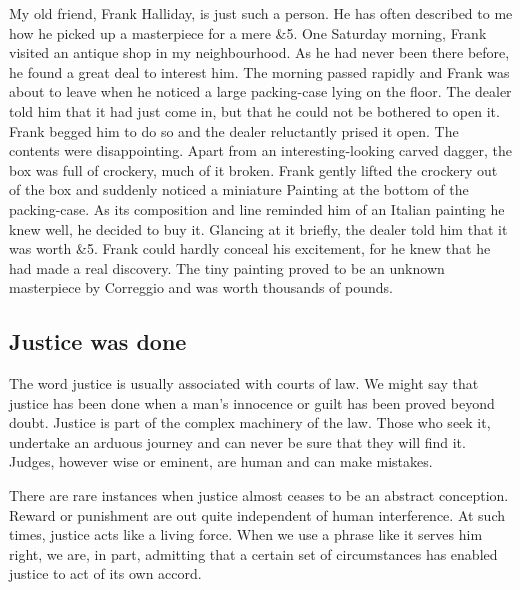 \documentclass[11pt]{article}
\begin{document}
My old friend, Frank Halliday, is just such a person. He has often described to me how he picked up a masterpiece for a mere \&5. One Saturday morning, Frank visited an antique shop in my neighbourhood. As he had never been there before, he found a great deal to interest him. The morning passed rapidly and Frank was about to leave when he noticed a large packing-case lying on the floor. The dealer told him that it had just come in, but that he could not be bothered to open it. Frank begged him to do so and the dealer reluctantly prised it open. The contents were disappointing. Apart from an interesting-looking carved dagger, the box was full of crockery, much of it broken. Frank gently lifted the crockery out of the box and suddenly noticed a miniature Painting at the bottom of the packing-case. As its composition and line reminded him of an Italian painting he knew well, he decided to buy it. Glancing at it briefly, the dealer told him that it was worth \&5. Frank could hardly conceal his excitement, for he knew that he had made a real discovery. The tiny painting proved to be an unknown masterpiece by Correggio and was worth thousands of pounds. 
\subsection{Justice was done}
\label{sec-1-35}

The word justice is usually associated with courts of law. We might say that justice has been done when a man's innocence or guilt has been proved beyond doubt. Justice is part of the complex machinery of the law. Those who seek it, undertake an arduous journey and can never be sure that they will find it. Judges, however wise or eminent, are human and can make mistakes. 

There are rare instances when justice almost ceases to be an abstract conception. Reward or punishment are out quite independent of human interference. At such times, justice acts like a living force. When we use a phrase like it serves him right, we are, in part, admitting that a certain set of circumstances has enabled justice to act of its own accord.
\end{document}
